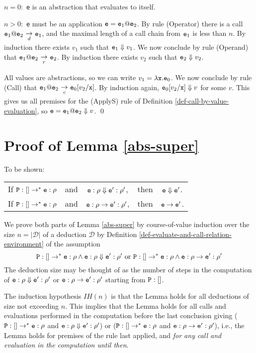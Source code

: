 \documentclass{LMCS}
\newcommand{\cal}{\mathcal}
\newcommand{\fl}{\noindent}
\newcommand{\vair}{\relax}
\newcommand{\bt}{\begin{tabular}}
\newcommand{\et}{\end{tabular}}
\newcommand{\bprf}{\proof}
\newcommand{\eprf}{\qed}
\theoremstyle{definition}\newtheorem{env}[thm]{Environment}
\newcommand{\tosub}[1]{\raisebox{-6.0pt}{$\ \stackrel{\textstyle\to}{\vrule height4.5 pt width0 pt
    depth2.5 pt \smash{\scriptstyle#1}}\ $}}
\begin{document}
$n=0:$ {\tt e} is an abstraction that evaluates to itself.

$n>0:$ {\tt e} must be an application ${\tt e}={\tt e}_1{\tt@e}_2$.
By rule (Operator) 
there is a call 
${\tt e}_1{\tt@e}_2 \tosub{d} {\tt e}_1$, 
and the maximal length of 
a call chain from ${\tt e}_1$ is less than $ n$. 
By induction there exists 
$v_1$ such that ${\tt e}_1\Downarrow v_1$. 
We  now  conclude by rule (Operand) 
that
${\tt e}_1{\tt@e}_2 \tosub{r} {\tt e}_2$. By induction
there exists $v_2$ such that ${\tt e}_2\Downarrow v_2$. 

All values are abstractions, so we can write 
$v_1 =\lambda {\tt x.e}_0$.
We  now conclude by rule (Call) 
that
${\tt e}_1{\tt@e}_2 \tosub{c} {\tt e}_0[v_2/{\tt x}]$. 
 By induction again, $ {\tt e}_0[v_2/{\tt x}]\Downarrow v$
 for some $v$.
This gives us all premises for the (ApplyS) rule of
Definition \ref{def-call-by-value-evaluation}, so
 ${\tt e}= {\tt e}_1{\tt@e}_2\Downarrow v$.
\eprf







\section{Proof of Lemma \ref{abs-super}}

\bprf  To be shown:
\hfill  \bt{ccccc} If ${\tt P}:[]\to^*{\tt e}:\rho$ &and& ${\tt e}:\rho\Downarrow{\tt e}':\rho'$, &then& 
${\tt e}\Downarrow{\tt e}'$. \\

\hfill  If  ${\tt P}:[]\to^*{\tt e}:\rho$  &and& ${\tt e}:\rho\to{\tt e}':\rho'$, &then& ${\tt e}\to{\tt e}'$.
\et
\vair

\fl We prove both parts of Lemma \ref{abs-super} by course-of-value induction over the size $n=|{\cal D}|$ of a deduction  ${\cal D}$ by Definition \ref{def-evaluate-and-call-relation-environment} of the
assumption 
$${\tt P}:[]\to^*{\tt e}:\rho\land {\tt e}:\rho\Downarrow{\tt e}':\rho'
\mbox{\ or\ }{\tt P}:[]\to^*{\tt e}:\rho\land {\tt e}:\rho\to{\tt e}':\rho'
$$
The deduction size may be 
thought of as the number of 
steps in the computation of 
${\tt e:\rho}\Downarrow{\tt e}':\rho'$ or ${\tt e}:\rho\to{\tt e}':\rho'$ starting from ${\tt P}:[]$.


The induction hypothesis $IH(n)$ is that the Lemma holds for all 
deductions of size not exceeding $n$.
This implies that the Lemma holds for all
calls and evaluations performed in the computation before the last 
conclusion giving 
(${\tt P}:[]\to^*{\tt e}:\rho$ and ${\tt e}:\rho \Downarrow {\tt e}':\rho'$) or (${\tt P}:[]\to^*{\tt e}:\rho$ and ${\tt e}:\rho \to {\tt e}':\rho'$), i.e.,  the Lemma holds for premises of the  rule last applied, and 
{\em for any call and 
evaluation in the computation until then}.
\end{document}

